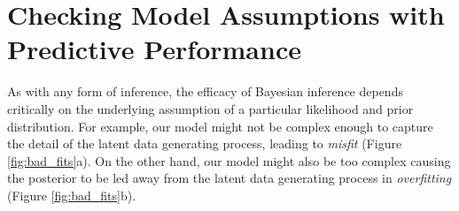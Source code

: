 \section{Checking Model Assumptions with Predictive Performance}

As with any form of inference, the efficacy of Bayesian inference
depends critically on the underlying assumption of a particular
likelihood and prior distribution.  For example, our model might
not be complex enough to capture the detail of the latent data
generating process, leading to \emph{misfit} (Figure \ref{fig:bad_fits}a).  
On the other hand, our model might also be too complex causing 
the posterior to be led away from the latent data generating 
process in \emph{overfitting} (Figure \ref{fig:bad_fits}b).

\begin{figure*}
\centering
%
%
\caption{Bayesian inference yields optimal learning only within 
the context of our model assumptions.  (a) Misfit occurs when
the small world does not contain the latent data generating
process and so can never recover it exactly. (b) Even if the
small world contains the latent data generating process, it
can still overfit by concentrating away from the latent data
generating process.
}
\label{fig:bad_fits}
\end{figure*}

